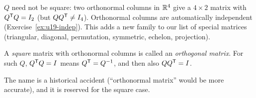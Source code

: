 $Q$ need not be square: two orthonormal columns in $\mathbb{R}^4$ give a $4\times 2$ matrix with
$Q^{\mathsf{T}} Q=I_2$ (but $QQ^{\mathsf{T}}\neq I_4$). Orthonormal columns are automatically independent
(Exercise~\ref{ex:u19-indep}). This adds a new family to our list of special matrices
(triangular, diagonal, permutation, symmetric, echelon, projection).

\begin{definition}\label{def:u19-orthogonal}
A \emph{square} matrix with orthonormal columns is called an \emph{orthogonal matrix}. For
such $Q$, $Q^{\mathsf{T}} Q=I$ means $Q^{\mathsf{T}}=Q^{-1}$, and then also $QQ^{\mathsf{T}}=I$.
\end{definition}

The name is a historical accident (``orthonormal matrix'' would be more accurate), and it is
reserved for the square case.

